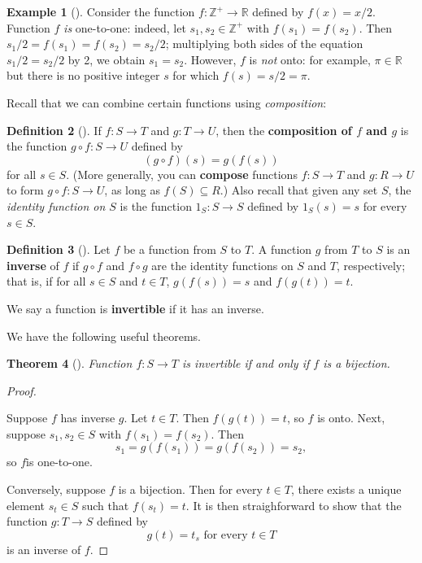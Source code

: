 \documentclass[10pt,]{book}
\newcommand{\terminology}[1]{\textbf{#1}}
\theoremstyle{plain}
\newtheorem{theorem}{Theorem}[section]
\theoremstyle{definition}
\newtheorem{definition}[theorem]{Definition}
\theoremstyle{definition}
\theoremstyle{definition}
\newtheorem{example}[theorem]{Example}
\theoremstyle{definition}
\numberwithin{equation}{section}
\def\Z{\mathbb{Z}}
\def\R{\mathbb{R}}
\begin{document}
\begin{example}[]\label{example-7}
Consider the function \(f: \Z^+ \to \R\) defined by \(f(x)=x/2\). Function \(f\) \emph{is} one-to-one: indeed, let \(s_1, s_2 \in \Z^+\) with \(f(s_1)=f(s_2)\). Then \(s_1/2=f(s_1)=f(s_2)=s_2/2\); multiplying both sides of the equation \(s_1/2=s_2/2\) by 2, we obtain \(s_1=s_2\). However, \(f\) is \emph{not} onto: for example, \(\pi\in \R\) but there is no positive integer \(s\) for which \(f(s)=s/2=\pi\).%
\end{example}
Recall that we can combine certain functions using \emph{composition}:%
\begin{definition}[{}]\label{definition-10}
\label{notation-26}
\label{notation-27}
If \(f:S\to T\) and \(g:T\to U\), then the  \terminology{composition of \(f\) and \(g\)} is the function \(g\circ f: S\to U\) defined by%
\begin{equation*}
(g\circ f)(s)=g(f(s))
\end{equation*}
for all \(s\in S\). (More generally, you can \terminology{compose} functions \(f:S\to T\) and \(g:R\to U\) to form \(g\circ f:S\to U\),  as long as \(f(S)\subseteq R\).) Also recall that given any set \(S\), the \emph{identity function on \(S\)} is the function \(1_S: S\to S\) defined by \(1_S(s)=s\) for every \(s\in S\).%
\end{definition}
\begin{definition}[{}]\label{definition-11}
Let \(f\) be a function from \(S\) to \(T\). A function \(g\) from \(T\) to \(S\) is an \terminology{inverse} of \(f\) if \(g\circ f\) and \(f\circ g\) are the identity functions on \(S\) and \(T\), respectively; that is, if for all \(s\in S\) and \(t\in
T\), \(g(f(s))=s\) and \(f(g(t))=t\).%
\par
We say a function is \terminology{invertible} if it has an inverse.%
\end{definition}
We have the following useful theorems.%
\begin{theorem}[{}]\label{invbij}
Function \(f:S\to T\) is invertible if and only if \(f\) is a bijection.%
\end{theorem}
\begin{proof}\hypertarget{proof-1}{}
Suppose \(f\) has inverse \(g\). Let \(t\in T\). Then \(f(g(t))=t\), so \(f\) is onto.  Next, suppose \(s_1,s_2\in S\) with \(f(s_1)=f(s_2)\). Then%
\begin{equation*}
s_1=g(f(s_1))=g(f(s_2))=s_2,
\end{equation*}
so \(f\)is one-to-one.%
\par
Conversely, suppose \(f\) is a bijection.  Then for every \(t\in T\), there exists a unique element \(s_t\in S\) such that \(f(s_t)=t\). It is then straighforward to show that the function \(g:T\to S\) defined by%
\begin{equation*}
g(t)=t_s \text{ for every }t\in T
\end{equation*}
is an inverse of \(f\).%
\end{proof}
\end{document}
